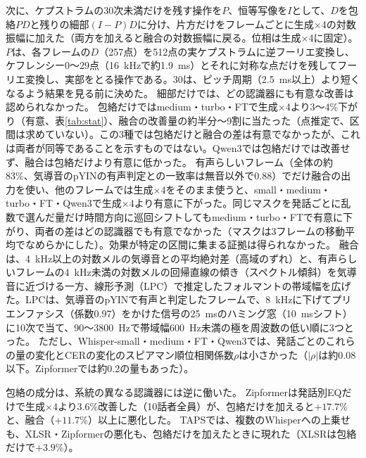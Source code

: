 \documentclass[xelatex,ja=standard,a4paper,twocolumn,10pt]{bxjsarticle}
\begin{document}
次に、ケプストラムの30次未満だけを残す操作を$P$、恒等写像を$I$として、$D$を包絡$PD$と残りの細部$(I-P)D$に分け、片方だけをフレームごとに生成×4の対数振幅に加えた（両方を加えると融合の対数振幅に戻る。位相は生成×4に固定）。
$P$は、各フレームの$D$（257点）を512点の実ケプストラムに逆フーリエ変換し、ケフレンシー0〜29点（16~kHzで約1.9~ms）とそれに対称な点だけを残してフーリエ変換し、実部をとる操作である。30は、ピッチ周期（2.5~ms以上）より短くなるよう結果を見る前に決めた。
細部だけでは、どの認識器にも有意な改善は認められなかった。
包絡だけではmedium・turbo・FTで生成×4より3〜4\%下がり（有意、表\ref{tab:stat}）、融合の改善量の約半分〜9割に当たった（点推定で、区間は求めていない）。この3種では包絡だけと融合の差は有意でなかったが、これは両者が同等であることを示すものではない。Qwen3では包絡だけでは改善せず、融合は包絡だけより有意に低かった。
有声らしいフレーム（全体の約83\%、気導音のpYIN\cite{pyin}の有声判定との一致率は無音以外で0.88）でだけ融合の出力を使い、他のフレームでは生成×4をそのまま使うと、small・medium・turbo・FT・Qwen3で生成×4より有意に下がった。同じマスクを発話ごとに乱数で選んだ量だけ時間方向に巡回シフトしてもmedium・turbo・FTで有意に下がり、両者の差はどの認識器でも有意でなかった（マスクは3フレームの移動平均でなめらかにした）。効果が特定の区間に集まる証拠は得られなかった。
融合は、4~kHz以上の対数メルの気導音との平均絶対差（高域のずれ）と、有声らしいフレームの4~kHz未満の対数メルの回帰直線の傾き（スペクトル傾斜）を気導音に近づける一方、線形予測（LPC）で推定したフォルマントの帯域幅を広げた。LPCは、気導音のpYINで有声と判定したフレームで、8~kHzに下げてプリエンファシス（係数0.97）をかけた信号の25~msのハミング窓（10~msシフト）に10次で当て、90〜3800~Hzで帯域幅600~Hz未満の極を周波数の低い順に3つとった。
ただし、Whisper-small・medium・FT・Qwen3では、発話ごとのこれらの量の変化とCERの変化のスピアマン順位相関係数$\rho$は小さかった（$|\rho|$は約0.08以下。Zipformerでは約0.2の量もあった）。

包絡の成分は、系統の異なる認識器には逆に働いた。
Zipformerは発話別EQだけで生成×4より3.6\%改善した（10話者全員）が、包絡だけを加えると$+17.7$\%と、融合（$+11.7$\%）以上に悪化した。
TAPSでは、複数のWhisperへの上乗せも、XLSR・Zipformerの悪化も、包絡だけを加えたときに現れた（XLSRは包絡だけで$+3.9$\%）。
\end{document}
